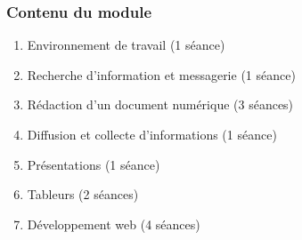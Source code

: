 \documentclass{beamer}
\begin{document}
\begin{frame}
\frametitle{Contenu du module}

\begin{enumerate}
	\item Environnement de travail (1 séance)
	\item Recherche d'information et messagerie (1 séance)
	\item Rédaction d'un document numérique (3 séances)
	\item Diffusion et collecte d'informations (1 séance)
	\item Présentations (1 séance)
	\item Tableurs (2 séances) 
	\item Développement web (4 séances)
\end{enumerate}

\end{frame}
\end{document}

